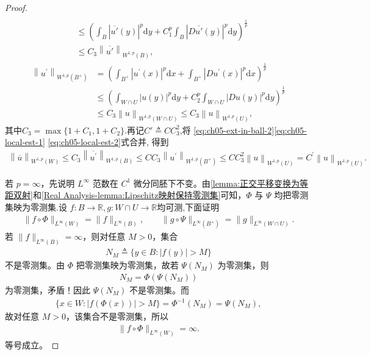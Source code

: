 \documentclass[../../main.tex]{subfiles}
\begin{document}
\begin{proof}
\begin{align}
\\
&\leqslant \left( \int_B{\left| \overline{u'}\left( y \right) \right|^p\mathrm{d}y}+C_{1}^{p}\int_B{\left| D\overline{u'}\left( y \right) \right|^p\mathrm{d}y} \right) ^{\frac{1}{p}}\nonumber\\
&\leqslant C_3\left\| \overline{u'} \right\| _{W^{1,p}\left( B \right)},
\label{eq:ch05-local-est-1}
\end{align}
\begin{align}
\left\| u^{\prime} \right\| _{W^{1,p}\left( B^+ \right)}&=\left( \int_{B^+}{\left| u^{\prime}\left( x \right) \right|^p\mathrm{d}x}+\int_{B^+}{\left| Du^{\prime}\left( x \right) \right|^p\mathrm{d}x} \right) ^{\frac{1}{p}}
\nonumber\\
&\leqslant \left( \int_{W\cap U}{\left| u\left( y \right) \right|^p\mathrm{d}y}+C_{2}^{p}\int_{W\cap U}{\left| Du\left( y \right) \right|^p\mathrm{d}y} \right) ^{\frac{1}{p}}
\nonumber\\
&\leqslant C_3\left\| u \right\| _{W^{1,p}\left( W\cap U \right)}\leqslant C_3\left\| u \right\| _{W^{1,p}\left( U \right)},\label{eq:ch05-local-est-2}
\end{align}
其中$C_3=\max \{ 1+C_{1},1+C_{2}\}$.再记$C'\triangleq CC_3^2$,将 \eqref{eq:ch05-ext-in-ball-2}\eqref{eq:ch05-local-est-1} \eqref{eq:ch05-local-est-2}式合并, 得到
\begin{align}
\left\| \overline{u} \right\| _{W^{1,p}\left( W \right)}\leqslant C_3\left\| \overline{u^{\prime}} \right\| _{W^{1,p}\left( B \right)}\leqslant CC_3\left\| u^{\prime} \right\| _{W^{1,p}\left( B^+ \right)}\leqslant CC_{3}^{2}\left\| u \right\| _{W^{1,p}\left( U \right)}=C^{\prime}\left\| u \right\| _{W^{1,p}\left( U \right)}.\label{eq:ch05-local-est-final}
\end{align}

若 \(p=\infty\)，先说明 \(L^\infty\) 范数在 \(C^1\) 微分同胚下不变。由\cref{lemma:正交平移变换为等距双射}和\cref{Real Analysis-lemma:Lipschitz映射保持零测集}可知，\(\Phi\) 与 \(\Psi\) 均把零测集映为零测集.设 \(f:B\to\mathbb{R}\),$\,g:W\cap U\to \mathbb{R}$均可测,下面证明
\begin{align}\label{eq::jiowiowijoijoijijojsiosioios3829237489}
\|f\circ\Phi\|_{L^\infty(W)}=\|f\|_{L^\infty(B)},\qquad
\|g\circ\Psi\|_{L^\infty(B^+)}=\|g\|_{L^\infty(W\cap U)}.
\end{align}
若 \(\|f\|_{L^\infty(B)}=\infty\)，则对任意 \(M>0\)，集合
\begin{align*}
N_M\triangleq\{y\in B:|f(y)|>M\}
\end{align*}
不是零测集。由 \(\Phi\) 把零测集映为零测集，故若 \(\Psi(N_M)\) 为零测集，则
\begin{align*}
N_M=\Phi(\Psi(N_M))
\end{align*}
为零测集，矛盾！因此 \(\Psi(N_M)\) 不是零测集。而
\begin{align*}
\{x\in W:|f(\Phi(x))|>M\}=\Phi^{-1}(N_M)=\Psi(N_M),
\end{align*}
故对任意 \(M>0\)，该集合不是零测集，所以
\begin{align*}
\|f\circ\Phi\|_{L^\infty(W)}=\infty.
\end{align*}
等号成立。


\end{proof}
\end{document}
